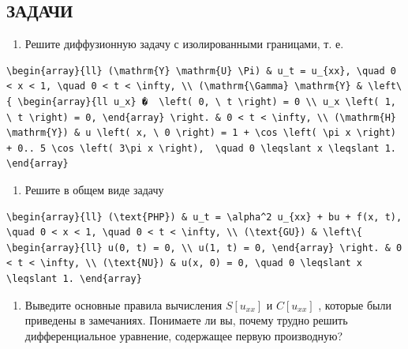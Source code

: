 \documentclass[
  ukrainian,
]{article}
\providecommand{\tightlist}{%
  \setlength{\itemsep}{0pt}\setlength{\parskip}{0pt}}
\begin{document}
\subsection{ЗАДАЧИ}\label{ux437ux430ux434ux430ux447ux438-4}

\begin{enumerate}
\def\labelenumi{\arabic{enumi}.}
\tightlist
\item
  Решите диффузионную задачу с изолированными границами, т. е.
\end{enumerate}

\begin{verbatim}
\begin{array}{ll} (\mathrm{Y} \mathrm{U} \Pi) & u_t = u_{xx}, \quad 0 < x < 1, \quad 0 < t < \infty, \\ (\mathrm{\Gamma} \mathrm{Y} & \left\{ \begin{array}{ll u_x} �  \left( 0, \ t \right) = 0 \\ u_x \left( 1, \ t \right) = 0, \end{array} \right. & 0 < t < \infty, \\ (\mathrm{H} \mathrm{Y}) & u \left( x, \ 0 \right) = 1 + \cos \left( \pi x \right) + 0.. 5 \cos \left( 3\pi x \right),  \quad 0 \leqslant x \leqslant 1. \end{array}
\end{verbatim}

\begin{enumerate}
\def\labelenumi{\arabic{enumi}.}
\setcounter{enumi}{1}
\tightlist
\item
  Решите в общем виде задачу
\end{enumerate}

\begin{verbatim}
\begin{array}{ll} (\text{PHP}) & u_t = \alpha^2 u_{xx} + bu + f(x, t), \quad 0 < x < 1, \quad 0 < t < \infty, \\ (\text{GU}) & \left\{ \begin{array}{ll} u(0, t) = 0, \\ u(1, t) = 0, \end{array} \right. & 0 < t < \infty, \\ (\text{NU}) & u(x, 0) = 0, \quad 0 \leqslant x \leqslant 1. \end{array}
\end{verbatim}

\begin{enumerate}
\def\labelenumi{\arabic{enumi}.}
\setcounter{enumi}{2}
\tightlist
\item
  Выведите основные правила вычисления \(S[u_{xx}]\) и \(C[u_{xx}]\) ,
  которые были приведены в замечаниях. Понимаете ли вы, почему трудно
  решить дифференциальное уравнение, содержащее первую производную?
\end{enumerate}
\end{document}
